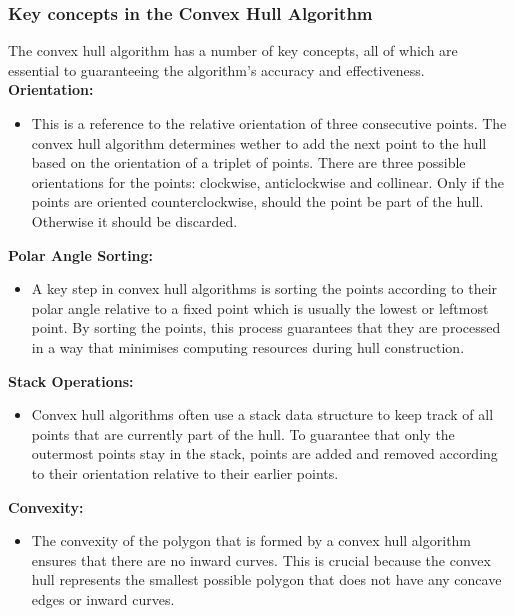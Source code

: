    \subsubsection{Key concepts in the Convex Hull Algorithm}
    The convex hull algorithm has a number of key concepts, all of which are essential to guaranteeing the algorithm's accuracy and effectiveness. \newline \newline
    \textbf{Orientation:}
    \begin{itemize}
        \item This is a reference to the relative orientation of three consecutive points. The convex hull algorithm determines wether to add the next point to the hull based on the orientation of a triplet of points. There are three possible orientations for the points: clockwise, anticlockwise and collinear. Only if the points are oriented counterclockwise, should the point be part of the hull. Otherwise it should be discarded.
    \end{itemize}

    \textbf{Polar Angle Sorting:}
    \begin{itemize}
        \item A key step in convex hull algorithms is sorting the points according to their polar angle relative to a fixed point which is usually the lowest or leftmost point. By sorting the points, this process guarantees that they are processed in a way that minimises computing resources during hull construction.
    \end{itemize}

    \textbf{Stack Operations:}
    \begin{itemize}
        \item Convex hull algorithms often use a stack data structure to keep track of all points that are currently part of the hull. To guarantee that only the outermost points stay in the stack, points are added and removed according to their orientation relative to their earlier points.
    \end{itemize}

    \textbf{Convexity:}
    \begin{itemize}
        \item The convexity of the polygon that is formed by a convex hull algorithm ensures that there are no inward curves. This is crucial because the convex hull represents the smallest possible polygon that does not have any concave edges or inward curves.
    \end{itemize} \autocite{Andi:keyConcepts}

